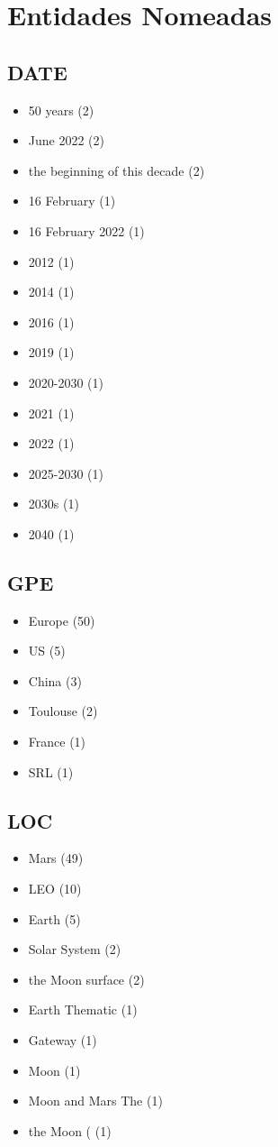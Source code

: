 \documentclass[12pt]{article}
\begin{document}
\section{Entidades Nomeadas}

\subsection*{DATE}
\begin{itemize}
\item 50 years (2)
\item June 2022 (2)
\item the beginning of this decade (2)
\item 16 February (1)
\item 16 February 2022 (1)
\item 2012 (1)
\item 2014 (1)
\item 2016 (1)
\item 2019 (1)
\item 2020-2030 (1)
\item 2021 (1)
\item 2022 (1)
\item 2025-2030 (1)
\item 2030s (1)
\item 2040 (1)
\end{itemize}

\subsection*{GPE}
\begin{itemize}
\item Europe (50)
\item US (5)
\item China (3)
\item Toulouse (2)
\item France (1)
\item SRL (1)
\end{itemize}

\subsection*{LOC}
\begin{itemize}
\item Mars (49)
\item LEO (10)
\item Earth (5)
\item Solar System (2)
\item the Moon surface (2)
\item Earth Thematic (1)
\item Gateway (1)
\item Moon (1)
\item Moon and Mars The (1)
\item the Moon ( (1)
\end{itemize}
\end{document}
